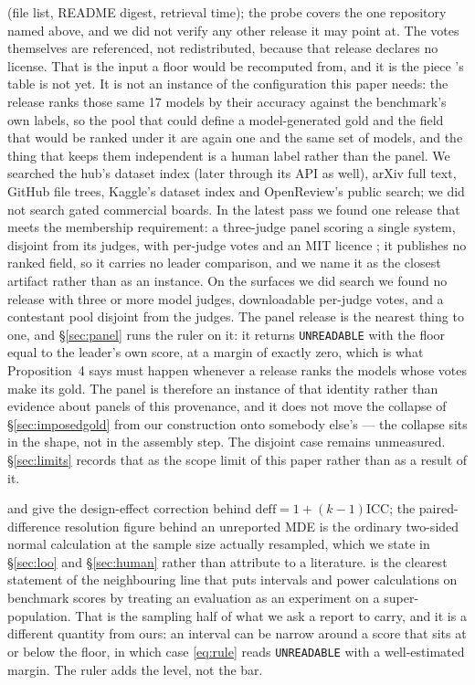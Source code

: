 \documentclass{article}
\begin{document}
\begin{description}
(file list, README digest, retrieval time); the probe covers the one repository named above, and we did not verify any other release it may point at. The votes themselves are referenced, not redistributed, because that release declares no license. That is the input a floor would be recomputed from, and it is the piece \cite{liu2025imperfect}'s table is not yet. It is not an instance of the configuration this paper needs: the release ranks those same 17 models by their accuracy against the benchmark's own labels, so the pool that could define a model-generated gold and the field that would be ranked under it are again one and the same set of models, and the thing that keeps them independent is a human label rather than the panel. We searched the hub's dataset index (later through its API as well), arXiv full text, GitHub file trees, Kaggle's dataset index and OpenReview's public search; we did not search gated commercial boards. In the latest pass we found one release that meets the membership requirement: a three-judge panel scoring a single system, disjoint from its judges, with per-judge votes and an {MIT} licence \cite{localgate2026judgepanel}; it publishes no ranked field, so it carries no leader comparison, and we name it as the closest artifact rather than as an instance. On the surfaces we did search we found no release with three or more model judges, downloadable per-judge votes, and a contestant pool disjoint from the judges. The panel release is the nearest thing to one, and \S\ref{sec:panel} runs the ruler on it: it returns \texttt{UNREADABLE} with the floor equal to the leader's own score, at a margin of exactly zero, which is what Proposition~4 says must happen whenever a release ranks the models whose votes make its gold. The panel is therefore an instance of that identity rather than evidence about panels of this provenance, and it does not move the collapse of \S\ref{sec:imposedgold} from our construction onto somebody else's --- the collapse sits in the shape, not in the assembly step. The disjoint case remains unmeasured. \S\ref{sec:limits} records that as the scope limit of this paper rather than as a result of it.
\item[Power-resolution bound.] \cite{camerongelbachmiller2007} and \cite{abadie2022clustering} give the design-effect correction behind $\mathrm{deff}=1+(k-1)\mathrm{ICC}$; the paired-difference resolution figure behind an unreported MDE is the ordinary two-sided normal calculation at the sample size actually resampled, which we state in \S\ref{sec:loo} and \S\ref{sec:human} rather than attribute to a literature. \cite{miller2024errorbars} is the clearest statement of the neighbouring line that puts intervals and power calculations on benchmark scores by treating an evaluation as an experiment on a super-population. That is the sampling half of what we ask a report to carry, and it is a different quantity from ours: an interval can be narrow around a score that sits at or below the floor, in which case \eqref{eq:rule} reads \texttt{UNREADABLE} with a well-estimated margin. The ruler adds the level, not the bar.

\end{description}
\end{document}
